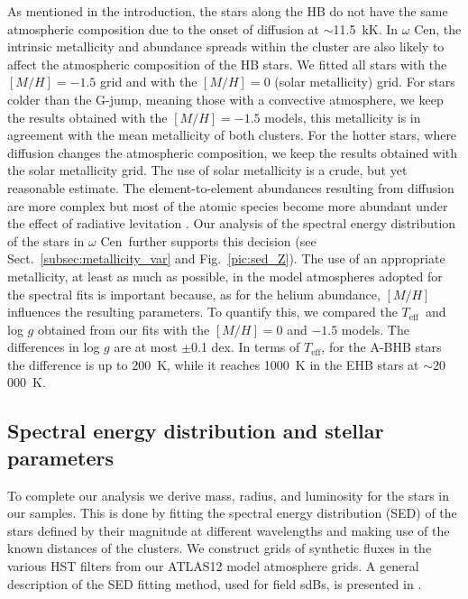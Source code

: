 \documentclass{aa}
\newcommand{\teff}{$T_{\text{eff}}$}
\newcommand{\Cen}{$\omega$ Cen}
\begin{document}
As mentioned in the introduction, the stars along the HB do not have the same atmospheric composition due to the onset of diffusion at $\sim$11.5~kK. In \Cen, the intrinsic metallicity and abundance spreads within the cluster are also likely to affect the atmospheric composition of the HB stars. 
We fitted all stars with the $[M/H]=-1.5$ grid and with the $[M/H]=0$ (solar metallicity) grid. For stars colder than the G-jump, meaning those with a convective atmosphere, we keep the results obtained with the $[M/H]=-1.5$ models, this metallicity is in agreement with the mean metallicity of both clusters. For the hotter stars, where diffusion changes the atmospheric composition, we keep the results obtained with the solar metallicity grid. The use of solar metallicity is a crude, but yet reasonable estimate. The element-to-element abundances resulting from diffusion are more complex but most of the atomic species become more abundant under the effect of radiative levitation \citep{behr03,brown17,2011A&A...529A..60M}. Our analysis of the spectral energy distribution of the stars in \Cen\ further supports this decision (see Sect.~\ref{subsec:metallicity_var} and Fig.~\ref{pic:sed_Z}).
The use of an appropriate metallicity, at least as much as possible, in the model atmospheres adopted for the spectral fits is important because, as for the helium abundance, $[M/H]$ influences the resulting parameters. To quantify this, we compared the \teff\ and log $g$ obtained from our fits with the $[M/H]=0$ and $-1.5$ models. The differences in log $g$ are at most $\pm$0.1 dex. In terms of \teff , for the A-BHB stars the difference is up to 200~K, while it reaches 1000~K in the EHB stars at $\sim$20\,000~K. 

\subsection{Spectral energy distribution and stellar parameters}\label{subsec:sed_fit}


To complete our analysis we derive mass, radius, and luminosity for the stars in our samples. This is done by fitting the spectral energy distribution (SED) of the stars defined by their magnitude at different wavelengths and making use of the known distances of the clusters. We construct grids of synthetic fluxes in the various HST filters from our ATLAS12 model atmosphere grids. A general description of the SED fitting method, used for field sdBs, is presented in \citet{heber2018}. 
\end{document}
